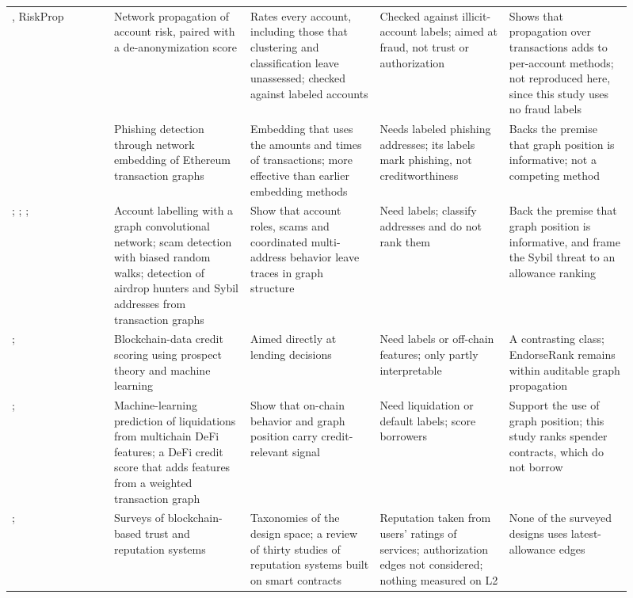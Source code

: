 {\begin{longtable}{p{0.15\linewidth}p{0.20\linewidth}p{0.19\linewidth}p{0.19\linewidth}p{0.18\linewidth}}
\textcite{lin2025riskprop}, RiskProp & Network propagation of account risk, paired with a de-anonymization score & Rates every account, including those that clustering and classification leave unassessed; checked against labeled accounts & Checked against illicit-account labels; aimed at fraud, not trust or authorization & Shows that propagation over transactions adds to per-account methods; not reproduced here, since this study uses no fraud labels \\
\textcite{wu2022phishers} & Phishing detection through network embedding of Ethereum transaction graphs & Embedding that uses the amounts and times of transactions; more effective than earlier embedding methods & Needs labeled phishing addresses; its labels mark phishing, not creditworthiness & Backs the premise that graph position is informative; not a competing method \\
\textcite{lin2024whoiswho}; \textcite{yan2023aparecium}; \textcite{zhou2024artemis}; \textcite{liu2025sybil} & Account labelling with a graph convolutional network; scam detection with biased random walks; detection of airdrop hunters and Sybil addresses from transaction graphs & Show that account roles, scams and coordinated multi-address behavior leave traces in graph structure & Need labels; classify addresses and do not rank them & Back the premise that graph position is informative, and frame the Sybil threat to an allowance ranking \\
\textcite{hassija2020lending}; \textcite{kotb2023credit} & Blockchain-data credit scoring using prospect theory and machine learning & Aimed directly at lending decisions & Need labels or off-chain features; only partly interpretable & A contrasting class; EndorseRank remains within auditable graph propagation \\
\textcite{palaiokrassas2024credit}; \textcite{m2026hurdle} & Machine-learning prediction of liquidations from multichain DeFi features; a DeFi credit score that adds features from a weighted transaction graph & Show that on-chain behavior and graph position carry credit-relevant signal & Need liquidation or default labels; score borrowers & Support the use of graph position; this study ranks spender contracts, which do not borrow \\
\textcite{bellini2020trust}; \textcite{almasoud2020reputation} & Surveys of blockchain-based trust and reputation systems & Taxonomies of the design space; a review of thirty studies of reputation systems built on smart contracts & Reputation taken from users' ratings of services; authorization edges not considered; nothing measured on L2 & None of the surveyed designs uses latest-allowance edges \\

\end{longtable}}
